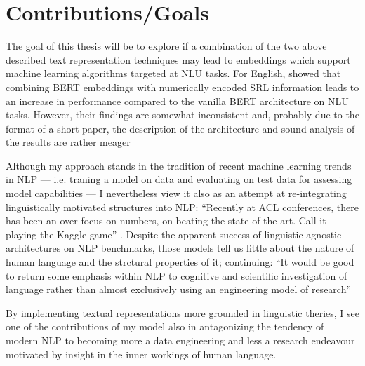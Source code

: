 \section{Contributions/Goals}

The goal of this thesis will be to explore if a combination of the two above described text
representation techniques may lead to embeddings which support machine learning algorithms
targeted at NLU tasks. For English, \cite{zhang2019semantics} showed that combining BERT
embeddings with numerically encoded SRL information leads to an increase in performance
compared to the vanilla BERT architecture on NLU tasks. However, their findings are somewhat
inconsistent and, probably due to the format of a short paper, the description of the
architecture and sound analysis of the results are {\color{red} rather meager}

Although my approach stands in the tradition of recent machine learning trends in NLP --- i.e.
traning a model on data and evaluating on test data for assessing model capabilities --- I
nevertheless view it also as an attempt at re-integrating linguistically motivated structures
into NLP: ``Recently at ACL conferences, there has been an over-focus on numbers, on beating the
state of the art. Call it playing the Kaggle game'' \citep[p.~702]{manning2015computational}.
Despite the apparent success of linguistic-agnostic architectures on NLP benchmarks, those
models tell us little about the nature of human language and the strctural properties of it;
\citeauthor{manning2015computational} continuing: ``It would be good to return some emphasis
within NLP to cognitive and scientific investigation of language rather than almost exclusively
using an engineering model of research'' \citep[p.~706]{manning2015computational}

By implementing textual representations more grounded in linguistic theries, I see one of the
contributions of my model also in antagonizing the tendency of modern NLP to becoming more a
data engineering and less a research endeavour motivated by insight in the inner workings
of human language.




